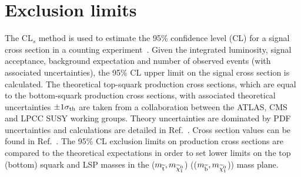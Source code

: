 \section{Exclusion limits}
\label{sec:STAT}

The CL$_{s}$ method is used to estimate the 95\% confidence level (CL) for a signal cross section in a counting experiment~\cite{bib:STAT_RooStats,PDG}.
Given the integrated luminosity, signal acceptance, background expectation and number of observed events (with associated uncertainties),
the 95\% CL upper limit on the signal cross section is calculated.
The theoretical top-squark production cross sections, which are equal to the bottom-squark production cross sections, with associated theoretical uncertainties $\pm1\sigma_{\rm th}$ are taken from a collaboration between the \ac{ATLAS}, \ac{CMS}
and \ac{LPCC} \ac{SUSY} working groups. 
Theory uncertainties are dominated by PDF uncertainties 
and calculations are detailed in Ref.~\cite{bib:SUSYxs}. 
Cross section values can be found in Ref.~\cite{stopsbottomxs}.  
The 95\% CL exclusion limits on production cross sections are compared to the theoretical expectations in order to set lower limits on the top (bottom) squark and LSP masses in the ($m_{\widetilde{{\rm t}}}, m_{\widetilde{\chi}^{0}_{1}}$) (($m_{\widetilde{{\rm b}}}, m_{\widetilde{\chi}^{0}_{1}}$)) mass plane. 


